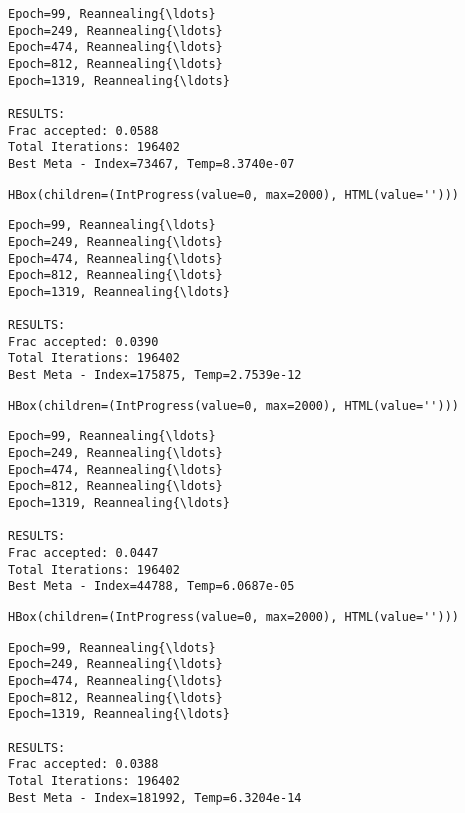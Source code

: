 \documentclass[11pt]{article}
\begin{document}
    
    \begin{Verbatim}[commandchars=\\\{\}]
Epoch=99, Reannealing{\ldots}
Epoch=249, Reannealing{\ldots}
Epoch=474, Reannealing{\ldots}
Epoch=812, Reannealing{\ldots}
Epoch=1319, Reannealing{\ldots}

RESULTS:
Frac accepted: 0.0588
Total Iterations: 196402
Best Meta - Index=73467, Temp=8.3740e-07

    \end{Verbatim}

    
    \begin{verbatim}
HBox(children=(IntProgress(value=0, max=2000), HTML(value='')))
    \end{verbatim}

    
    \begin{Verbatim}[commandchars=\\\{\}]
Epoch=99, Reannealing{\ldots}
Epoch=249, Reannealing{\ldots}
Epoch=474, Reannealing{\ldots}
Epoch=812, Reannealing{\ldots}
Epoch=1319, Reannealing{\ldots}

RESULTS:
Frac accepted: 0.0390
Total Iterations: 196402
Best Meta - Index=175875, Temp=2.7539e-12

    \end{Verbatim}

    
    \begin{verbatim}
HBox(children=(IntProgress(value=0, max=2000), HTML(value='')))
    \end{verbatim}

    
    \begin{Verbatim}[commandchars=\\\{\}]
Epoch=99, Reannealing{\ldots}
Epoch=249, Reannealing{\ldots}
Epoch=474, Reannealing{\ldots}
Epoch=812, Reannealing{\ldots}
Epoch=1319, Reannealing{\ldots}

RESULTS:
Frac accepted: 0.0447
Total Iterations: 196402
Best Meta - Index=44788, Temp=6.0687e-05

    \end{Verbatim}

    
    \begin{verbatim}
HBox(children=(IntProgress(value=0, max=2000), HTML(value='')))
    \end{verbatim}

    
    \begin{Verbatim}[commandchars=\\\{\}]
Epoch=99, Reannealing{\ldots}
Epoch=249, Reannealing{\ldots}
Epoch=474, Reannealing{\ldots}
Epoch=812, Reannealing{\ldots}
Epoch=1319, Reannealing{\ldots}

RESULTS:
Frac accepted: 0.0388
Total Iterations: 196402
Best Meta - Index=181992, Temp=6.3204e-14

    \end{Verbatim}
\end{document}
